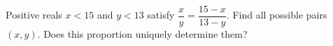 Positive reals $ x<15 $ and $ y<13 $ satisfy $\dfrac{x}{y}=\dfrac{15-x}{13-y}$. Find all possible pairs $(x,y)$. Does this proportion uniquely determine them?
